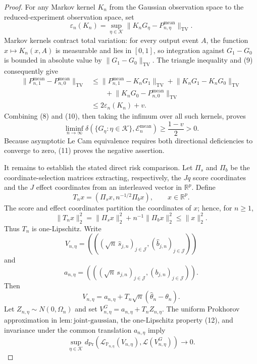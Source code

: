 \documentclass{article}
\begin{document}
\begin{proof}
For any Markov kernel \(K_n\) from the Gaussian observation space to the reduced-experiment observation space, set
\[
 \varepsilon_n(K_n)=
 \sup_{\eta\in\mathcal K}
 \lVert K_nG_\eta-P^{\mathrm{mean}}_{n,\eta}\rVert_{\mathrm{TV}}.
\]
Markov kernels contract total variation: for every output event \(A\), the function \(x\mapsto K_n(x,A)\) is measurable and lies in \([0,1]\), so integration against \(G_1-G_0\) is bounded in absolute value by \(\lVert G_1-G_0\rVert_{\mathrm{TV}}\). The triangle inequality and (9) consequently give
\[
 \begin{aligned}
 \lVert P^{\mathrm{mean}}_{n,1}-P^{\mathrm{mean}}_{n,0}\rVert_{\mathrm{TV}}
 &\leq
 \lVert P^{\mathrm{mean}}_{n,1}-K_nG_1\rVert_{\mathrm{TV}}
 +\lVert K_nG_1-K_nG_0\rVert_{\mathrm{TV}}\\
 &\qquad
 +\lVert K_nG_0-P^{\mathrm{mean}}_{n,0}\rVert_{\mathrm{TV}}\\
 &\leq2\varepsilon_n(K_n)+v.
 \end{aligned}
 \tag{10}
\]
Combining (8) and (10), then taking the infimum over all such kernels, proves
\[
 \liminf_{n\to\infty}
 \delta\!\left(\{G_\eta:\eta\in\mathcal K\},
                 \mathcal E_n^{\mathrm{mean}}\right)
 \geq\frac{1-v}{2}>0.
 \tag{11}
\]
Because asymptotic Le Cam equivalence requires both directional deficiencies to converge to zero, (11) proves the negative assertion.

It remains to establish the stated direct risk comparison. Let \(\Pi_s\) and \(\Pi_b\) be the coordinate-selection matrices extracting, respectively, the \(Jq\) score coordinates and the \(J\) effect coordinates from an interleaved vector in \(\mathbb R^p\). Define
\[
 T_nx=(\Pi_sx,n^{-1/2}\Pi_bx),
 \qquad x\in\mathbb R^p.
\]
The score and effect coordinates partition the coordinates of \(x\); hence, for \(n\geq1\),
\[
 \lVert T_nx\rVert_2^2
 =\lVert\Pi_sx\rVert_2^2+n^{-1}\lVert\Pi_bx\rVert_2^2
 \leq\lVert x\rVert_2^2.
 \tag{12}
\]
Thus \(T_n\) is one-Lipschitz. Write
\[
 V_{n,\eta}
 =\left(((\sqrt n\,\widehat s_{j,n})_{j\in\mathcal J},
          (\widehat b_{j,n})_{j\in\mathcal J})\right)
\]
and
\[
 a_{n,\eta}
 =\left(((\sqrt n\,s_{j,n})_{j\in\mathcal J},
          (b_{j,n})_{j\in\mathcal J})\right).
\]
Then
\[
 V_{n,\eta}
 =a_{n,\eta}+T_n\sqrt n(\widehat\theta_n-\theta_n).
 \tag{13}
\]
Let \(Z_{n,\eta}\sim N(0,\Omega_n)\) and set \(V^G_{n,\eta}=a_{n,\eta}+T_nZ_{n,\eta}\). The uniform Prokhorov approximation in \(\mathrm{lem:joint\text{-}gaussian}\), the one-Lipschitz property (12), and invariance under the common translation \(a_{n,\eta}\) imply
\[
 \sup_{\eta\in\mathcal K}
 d_{\mathrm{Pr}}\!\left(
   \mathcal L_{\mathbb P_{n,\eta}}(V_{n,\eta}),
   \mathcal L(V^G_{n,\eta})
 \right)
 \longrightarrow0.
 \tag{14}
\]


\end{proof}
\end{document}
